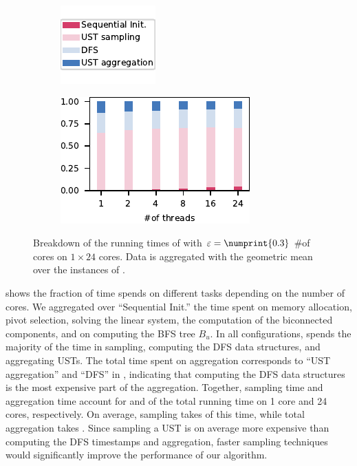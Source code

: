 \begin{figure}[tb]
\centering
\begin{subfigure}[c]{.3\textwidth}
\centering
\includegraphics[width=.5\textwidth]{sources/plots/el-clos/legend-time-breakdown.pdf}
\end{subfigure}\hfill
\begin{subfigure}[c]{.6\textwidth}
\centering
\includegraphics[width=.7\textwidth]{sources/plots/el-clos/time-breakdown.pdf}
\end{subfigure}
\caption{Breakdown of the running times of \ust with $\epsilon = \numprint{0.3}$
\wrt \#of cores on $1\times 24$ cores. Data is aggregated with the geometric
mean over the instances of .}
\label{fig:el-clos:time-breakdown}
\end{figure}

 shows the fraction of time \ust spends on
different tasks depending on the number of cores. We aggregated over
\enquote{Sequential Init.} the time spent on memory allocation, pivot
selection, solving the linear system, the computation of the biconnected
components, and on computing the BFS tree $B_u$. In all configurations, \ust
spends the majority of the time in sampling, computing the DFS data structures,
and aggregating USTs. The total time spent on aggregation corresponds to
\enquote{UST aggregation} and \enquote{DFS} in
, indicating that computing the DFS data
structures is the most expensive part of the aggregation. Together, sampling
time and aggregation time account for \ustFracOneCore and \ustFracAllCores of
the total running time on 1 core and 24 cores, respectively. On average,
sampling takes \avgSampling of this time, while total aggregation takes
\avgAggregate. Since sampling a UST is on average \aggOverSampl more expensive
than computing the DFS timestamps and aggregation, faster sampling techniques
would significantly improve the performance of our algorithm.

